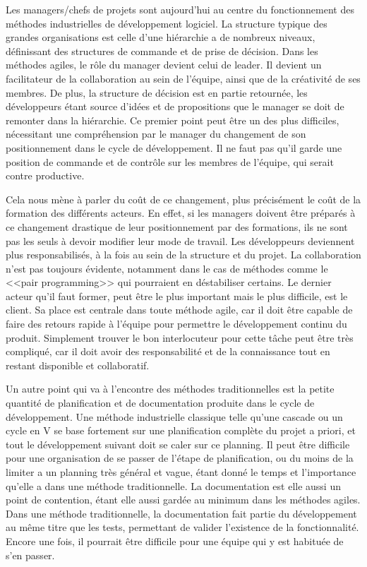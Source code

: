 \documentclass[openany, 11pt]{memoir}
\begin{document}

Les managers/chefs de projets sont aujourd'hui au centre du fonctionnement des méthodes industrielles de développement logiciel. La structure typique des grandes organisations est celle d'une hiérarchie a de nombreux niveaux, définissant des structures de commande et de prise de décision. Dans les méthodes agiles, le rôle du manager devient celui de leader. Il devient un facilitateur de la collaboration au sein de l'équipe, ainsi que de la créativité de ses membres. De plus, la structure de décision est en partie retournée, les développeurs étant source d'idées et de propositions que le manager se doit de remonter dans la hiérarchie. Ce premier point peut être un des plus difficiles, nécessitant une compréhension par le manager du changement de son positionnement dans le cycle de développement. Il ne faut pas qu'il garde une position de commande et de contrôle sur les membres de l'équipe, qui serait contre productive.

Cela nous mène à parler du coût de ce changement, plus précisément le coût de la formation des différents acteurs. En effet, si les managers doivent être préparés à ce changement drastique de leur positionnement par des formations, ils ne sont pas les seuls à devoir modifier leur mode de travail. Les développeurs deviennent plus responsabilisés, à la fois au sein de la structure et du projet. La collaboration n'est pas toujours évidente, notamment dans le cas de méthodes comme le <<pair programming>> qui pourraient en déstabiliser certains. Le dernier acteur qu'il faut former, peut être le plus important mais le plus difficile, est le client. Sa place est centrale dans toute méthode agile, car il doit être capable de faire des retours rapide à l'équipe pour permettre le développement continu du produit. Simplement trouver le bon interlocuteur pour cette tâche peut être très compliqué, car il doit avoir des responsabilité et de la connaissance tout en restant disponible et collaboratif.

Un autre point qui va à l'encontre des méthodes traditionnelles est la petite quantité de planification et de documentation produite dans le cycle de développement. Une méthode industrielle classique telle qu'une cascade \cite{waterfall} ou un cycle en V se base fortement sur une planification complète du projet a priori, et tout le développement suivant doit se caler sur ce planning. Il peut être difficile pour une organisation de se passer de l'étape de planification, ou du moins de la limiter a un planning très général et vague, étant donné le temps et l'importance qu'elle a dans une méthode traditionnelle. La documentation est elle aussi un point de contention, étant elle aussi gardée au minimum dans les méthodes agiles. Dans une méthode traditionnelle, la documentation fait partie du développement au même titre que les tests, permettant de valider l'existence de la fonctionnalité. Encore une fois, il pourrait être difficile pour une équipe qui y est habituée de s'en passer.
\end{document}
